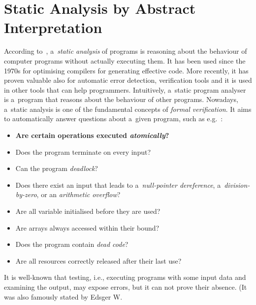 \section{Static Analysis by Abstract Interpretation}
\label{sec:staticAnalysisAI}

According to~\cite{staticAnalysisMoller}, a~\emph{static analysis} of 
programs is reasoning about the behaviour of computer programs without 
actually executing them. It has been used since the 1970s for optimising
compilers for generating effective code. More recently, it has proven 
valuable also for automatic error detection, verification tools and it 
is used in other tools that can help programmers. Intuitively,
a~static program analyser is a~program that reasons about the behaviour
of other programs. Nowadays, a~static analysis is one of the fundamental
concepts of \emph{formal verification}. It aims to automatically answer
questions about a~given program, such as e.g.~\cite{staticAnalysisMoller}:
\begin{itemize}
    \item
        \textbf{Are certain operations executed \emph{atomically}?}
        
    \item
        Does the program terminate on every input?
        
    \item 
        Can the program \emph{deadlock}?
        
    \item 
        Does there exist an input that leads to a~\emph{null-pointer 
        dereference}, a~\emph{division-by-zero}, or an \emph{arithmetic 
        overflow}?
        
    \item
        Are all variable initialised before they are used?
        
    \item
        Are arrays always accessed within their bound?
        
    \item
        Does the program contain \emph{dead code}?
        
    \item 
        Are all resources correctly released after their last
        use?
\end{itemize}
It is well-known that testing, i.e., executing programs
with some input data and examining the output, may expose errors, but it
can not prove their absence. (It was also famously stated by Edsger W. 

